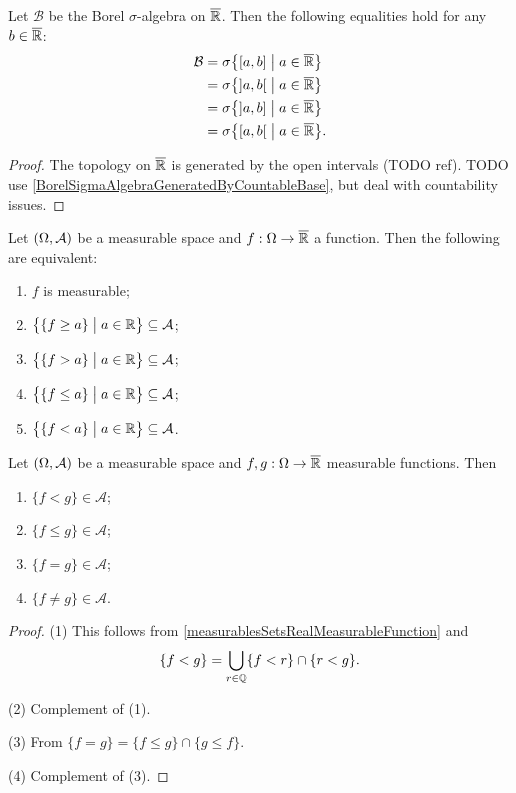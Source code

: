 \begin{proposition}
Let $\mathcal{B}$ be the Borel $\sigma$-algebra on $\overline{\mathbb{R}}$. Then the following equalities hold for any $b\in\overline{\mathbb{R}}$:
\begin{align*}
\mathcal{B} &= \sigma\setbuilder{\interval[c]{a,b}}{a\in \overline{\R}}\\
&= \sigma\setbuilder{\interval[o]{a,b}}{a\in \overline{\R}} \\
&= \sigma\setbuilder{\interval[oc]{a,b}}{a\in \overline{\R}} \\
&= \sigma\setbuilder{\interval[co]{a,b}}{a\in \overline{\R}}.
\end{align*}
\end{proposition}
\begin{proof}
The topology on $\overline{\mathbb{R}}$ is generated by the open intervals (TODO ref). TODO use \ref{BorelSigmaAlgebraGeneratedByCountableBase}, but deal with countability issues.
\end{proof}
\begin{corollary} \label{measurablesSetsRealMeasurableFunction}
Let $\sSet{\Omega, \mathcal{A}}$ be a measurable space and $f: \Omega \to \overline{\mathbb{R}}$ a function. Then the following are equivalent:
\begin{enumerate}
\item $f$ is measurable;
\item $\setbuilder{\{f\geq a\}\big.}{a\in\R} \subseteq \mathcal{A}$;
\item $\setbuilder{\{f > a\}\big.}{a\in\R} \subseteq \mathcal{A}$;
\item $\setbuilder{\{f \leq a\}\big.}{a\in\R} \subseteq \mathcal{A}$;
\item $\setbuilder{\{f < a\}\big.}{a\in\R} \subseteq \mathcal{A}$.
\end{enumerate}
\end{corollary}

\begin{proposition} \label{measurablesSetsTwoRealMeasurableFunctions}
Let $\sSet{\Omega, \mathcal{A}}$ be a measurable space and $f,g: \Omega \to \overline{\mathbb{R}}$ measurable functions. Then
\begin{enumerate}
\item $\{f < g\} \in \mathcal{A}$;
\item $\{f \leq g\} \in \mathcal{A}$;
\item $\{f = g\} \in \mathcal{A}$;
\item $\{f \neq g\} \in \mathcal{A}$.
\end{enumerate}
\end{proposition}
\begin{proof}
(1) This follows from \ref{measurablesSetsRealMeasurableFunction} and
\[ \{f < g \} = \bigcup_{r\in\mathbb{Q}}\{f<r\}\cap \{r < g\}. \]

(2) Complement of (1).

(3) From $\{f = g\} = \{f \leq g\}\cap \{g \leq f\}$.

(4) Complement of (3).
\end{proof}

